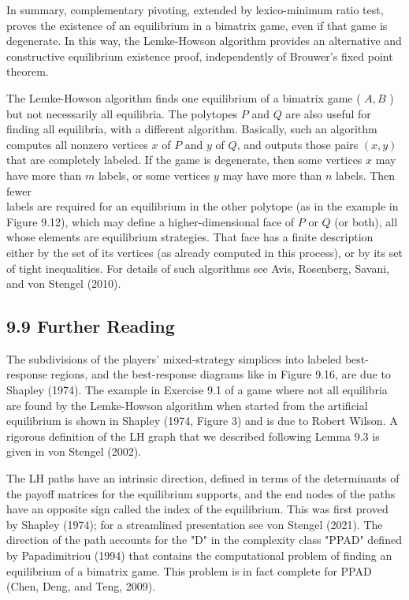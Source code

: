 \documentclass[12pt]{article}
\begin{document}
In summary, complementary pivoting, extended by lexico-minimum ratio test, proves the existence of an equilibrium in a bimatrix game, even if that game is degenerate. In this way, the Lemke-Howson algorithm provides an alternative and constructive equilibrium existence proof, independently of Brouwer's fixed point theorem.

The Lemke-Howson algorithm finds one equilibrium of a bimatrix game ( $A, B$ ) but not necessarily all equilibria. The polytopes $P$ and $Q$ are also useful for finding all equilibria, with a different algorithm. Basically, such an algorithm computes all nonzero vertices $x$ of $P$ and $y$ of $Q$, and outputs those pairs $(x, y)$ that are completely labeled. If the game is degenerate, then some vertices $x$ may have more than $m$ labels, or some vertices $y$ may have more than $n$ labels. Then fewer\\
labels are required for an equilibrium in the other polytope (as in the example in Figure 9.12), which may define a higher-dimensional face of $P$ or $Q$ (or both), all whose elements are equilibrium strategies. That face has a finite description either by the set of its vertices (as already computed in this process), or by its set of tight inequalities. For details of such algorithms see Avis, Rosenberg, Savani, and von Stengel (2010).

\subsection*{9.9 Further Reading}
The subdivisions of the players' mixed-strategy simplices into labeled best-response regions, and the best-response diagrams like in Figure 9.16, are due to Shapley (1974). The example in Exercise 9.1 of a game where not all equilibria are found by the Lemke-Howson algorithm when started from the artificial equilibrium is shown in Shapley (1974, Figure 3) and is due to Robert Wilson. A rigorous definition of the LH graph that we described following Lemma 9.3 is given in von Stengel (2002).

The LH paths have an intrinsic direction, defined in terms of the determinants of the payoff matrices for the equilibrium supports, and the end nodes of the paths have an opposite sign called the index of the equilibrium. This was first proved by Shapley (1974); for a streamlined presentation see von Stengel (2021). The direction of the path accounts for the "D" in the complexity class "PPAD" defined by Papadimitriou (1994) that contains the computational problem of finding an equilibrium of a bimatrix game. This problem is in fact complete for PPAD (Chen, Deng, and Teng, 2009).
\end{document}
